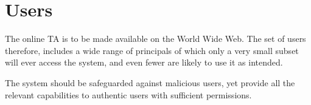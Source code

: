 
\section{Users}

The online TA is to be made available on the World Wide Web. The set of users
therefore, includes a wide range of principals of which only a very small
subset will ever access the system, and even fewer are likely to use it as
intended.

The system should be safeguarded against malicious users, yet provide all the
relevant capabilities to authentic users with sufficient permissions.




